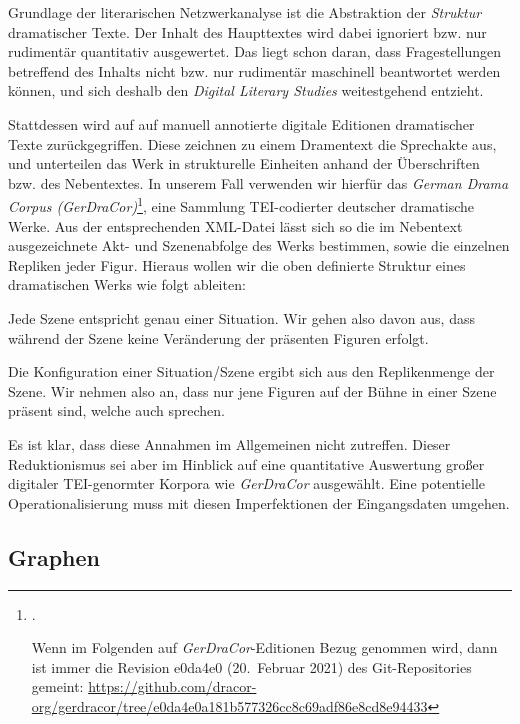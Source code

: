 \documentclass[a4paper,10pt,abstract=true,headings=small]{scrartcl}
\newcommand{\eng}[1]{\textenglish{\emph{#1}}}
\begin{document}
Grundlage der literarischen Netzwerkanalyse ist die Abstraktion der \emph{Struktur} dramatischer Texte.
Der Inhalt des Haupttextes wird dabei ignoriert bzw. nur rudimentär quantitativ ausgewertet.
Das liegt schon daran, dass Fragestellungen betreffend des Inhalts nicht bzw. nur rudimentär maschinell beantwortet werden können, und sich deshalb den \eng{Digital Literary Studies} weitestgehend entzieht.\autocite[Vgl.~auch][607]{jannidis_computergestuetzte_2017}

Stattdessen wird auf auf manuell annotierte digitale Editionen dramatischer Texte zurückgegriffen.
Diese zeichnen zu einem Dramentext die Sprechakte aus, und unterteilen das Werk in strukturelle Einheiten anhand der Überschriften bzw. des Nebentextes.
In unserem Fall verwenden wir hierfür das \emph{German Drama Corpus (GerDraCor)}\footnote{\cite{fischer_programmable_2019}.\par Wenn im Folgenden auf \emph{GerDraCor}-Editionen Bezug genommen wird, dann ist immer die Revision e0da4e0 (20.~Februar 2021) des Git-Repositories gemeint: \url{https://github.com/dracor-org/gerdracor/tree/e0da4e0a181b577326cc8c69adf86e8cd8e94433}}, eine Sammlung TEI-codierter deutscher dramatische Werke. %
Aus der entsprechenden XML-Datei lässt sich so die im Nebentext ausgezeichnete Akt- und Szenenabfolge des Werks bestimmen, sowie die einzelnen Repliken jeder Figur.
Hieraus wollen wir die oben definierte Struktur eines dramatischen Werks wie folgt ableiten:
\begin{enumerate*}
    \item Jede Szene entspricht genau einer Situation.
        Wir gehen also davon aus, dass während der Szene keine Veränderung der präsenten Figuren erfolgt.
    \item Die Konfiguration einer Situation/Szene ergibt sich aus den Replikenmenge der Szene. %
        Wir nehmen also an, dass nur jene Figuren auf der Bühne in einer Szene präsent sind, welche auch sprechen.
\end{enumerate*}

Es ist klar, dass diese Annahmen im Allgemeinen nicht zutreffen.
Dieser Reduktionismus sei aber im Hinblick auf eine quantitative Auswertung großer digitaler TEI-genormter Korpora wie \emph{GerDraCor} ausgewählt.
Eine potentielle Operationalisierung muss mit diesen Imperfektionen der Eingangsdaten umgehen.


\subsection{Graphen}
\end{document}
